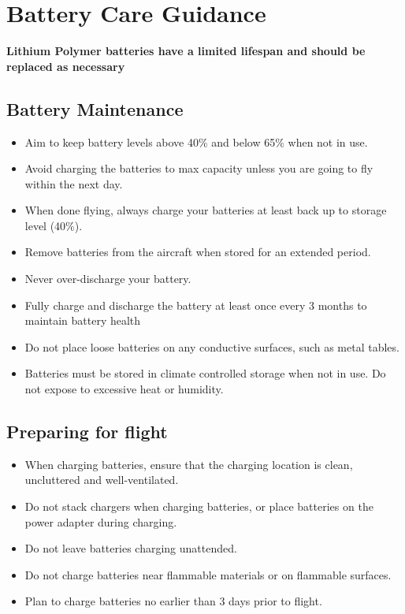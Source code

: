 \documentclass[
]{book}
\providecommand{\tightlist}{%
  \setlength{\itemsep}{0pt}\setlength{\parskip}{0pt}}
\begin{document}
\hypertarget{ch-battery-care}{%
\chapter*{Battery Care Guidance}\label{ch-battery-care}}

\textbf{Lithium Polymer batteries have a limited lifespan and should be replaced as necessary}

\hypertarget{battery-maintenance}{%
\section{Battery Maintenance}\label{battery-maintenance}}

\begin{itemize}
\tightlist
\item
  Aim to keep battery levels above 40\% and below 65\% when not in use.
\item
  Avoid charging the batteries to max capacity unless you are going to fly within the next day.
\item
  When done flying, always charge your batteries at least back up to storage level (40\%).
\item
  Remove batteries from the aircraft when stored for an extended period.
\item
  Never over-discharge your battery.
\item
  Fully charge and discharge the battery at least once every 3 months to maintain battery health
\item
  Do not place loose batteries on any conductive surfaces, such as metal tables.
\item
  Batteries must be stored in climate controlled storage when not in use. Do not expose to excessive heat or humidity.
\end{itemize}

\hypertarget{preparing-for-flight}{%
\section{Preparing for flight}\label{preparing-for-flight}}

\begin{itemize}
\tightlist
\item
  When charging batteries, ensure that the charging location is clean, uncluttered and well-ventilated.
\item
  Do not stack chargers when charging batteries, or place batteries on the power adapter during charging.
\item
  Do not leave batteries charging unattended.
\item
  Do not charge batteries near flammable materials or on flammable surfaces.
\item
  Plan to charge batteries no earlier than 3 days prior to flight.
\end{itemize}
\end{document}
